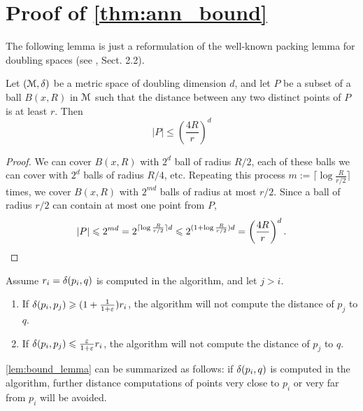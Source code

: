 \section{Proof of \cref{thm:ann_bound}}
\label{sec:proof_ann}

The following lemma is just a reformulation of the well-known
packing lemma for doubling spaces (see \cite{smid_2009}, Sect. 2.2).

\begin{lemma}
\label{lem:packing_lemma}
 Let $(\metricspace,\dist)$ be a metric space of doubling dimension $d$, and let $P$ be a subset of a ball 
 $B(x,R)$ in $\metricspace$ such that the distance between any two distinct points of $P$ is at least $r$.
 Then 
 \[|P|\leq \left(\frac{4R}{r}\right)^{d}\]

\end{lemma}
\begin{proof}
We can cover $B(x,R)$ with $2^d$ ball of radius $R/2$, each of these balls we can cover with $2^d$
balls of radius $R/4$, etc. Repeating this process $m := \lceil \log \frac{R}{r/2} \rceil$ times, 
we cover
$B(x, R)$ with $2^{md}$ balls of radius at most $r/2$. Since a ball of radius $r/2$ can
contain at most one point from $P$, 
\[|P|\leq 2^{md}= 2^{\lceil \log \frac{R}{r/2} \rceil d}\leq 2^{(1 + \log \frac{R}{r/2})d}=\left(\frac{4R}{r}\right)^{d}.\qedhere\]
\end{proof}


\begin{lemma}
\label{lem:bound_lemma}
Assume $r_i=\dist(p_i,q)$ is computed in the algorithm, and let $j>i$.
\begin{enumerate}
\item If $\dist(p_i,p_j)\geq (1+\frac{1}{1+\eps}) r_i$, the algorithm will not compute the distance
of $p_j$ to $q$.
\item If $\dist(p_i,p_j)\leq\frac{\eps}{1+\eps}r_i$, the algorithm will not compute
the distance of $p_j$ to $q$.
\end{enumerate}
\end{lemma}

\cref{lem:bound_lemma}
can be summarized as follows: if $\dist(p_i,q)$ is computed in the algorithm,
further distance computations of points very close to $p_i$ or very far from $p_i$
will be avoided.


